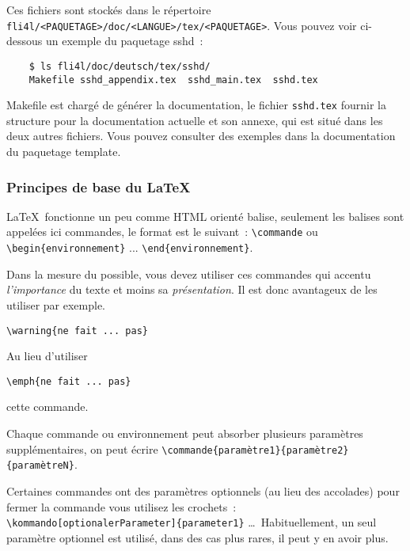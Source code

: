 Ces fichiers sont stockés dans le répertoire \texttt{fli4l/<PAQUETAGE>/doc/<LANGUE>/tex/<PAQUETAGE>}.
Vous pouvez voir ci-dessous un exemple du paquetage \og{}sshd\fg{}~:

\begin{verbatim}
    $ ls fli4l/doc/deutsch/tex/sshd/
    Makefile sshd_appendix.tex  sshd_main.tex  sshd.tex
\end{verbatim}

Makefile est chargé de générer la documentation, le fichier \texttt{sshd.tex}
fournir la structure pour la documentation actuelle et son annexe, qui est situé
dans les deux autres fichiers. Vous pouvez consulter des exemples dans la documentation
du paquetage \og{}template\fg{}.


\subsubsection{Principes de base du \LaTeX}

\LaTeX\ fonctionne un peu comme HTML \og{}orienté balise\fg{}, seulement les balises
sont appelées ici \og{}commandes\fg{}, le format est le suivant~: \verb*?\commande?
ou \verb*?\begin{environnement}? ... \verb*?\end{environnement}?.

Dans la mesure du possible, vous devez utiliser ces commandes qui accentu \emph{l'importance}
du texte et moins sa \emph{présentation}. Il est donc avantageux de les utiliser par exemple.

\begin{example}
\verb*?\warning{ne fait ... pas}?
\end{example}

\noindent Au lieu d'utiliser

\begin{example}
\verb*?\emph{ne fait ... pas}?
\end{example}

\noindent cette commande.

Chaque commande ou environnement peut absorber plusieurs paramètres
supplémentaires, on peut écrire \verb*?\commande{paramètre1}{paramètre2}{paramètreN}?.

Certaines commandes ont des paramètres optionnels (au lieu des accolades) pour fermer
la commande vous utilisez les crochets~: \verb*?\kommando[optionalerParameter]{parameter1}?
\ldots\ Habituellement, un seul paramètre optionnel est utilisé, dans des cas plus
rares, il peut y en avoir plus.

